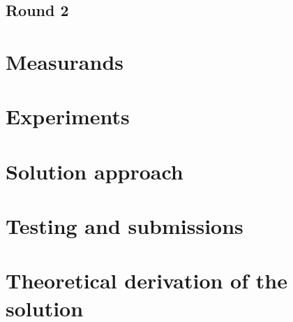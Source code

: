 \subsection{Round 2}




\section{Measurands}

\section{Experiments}
%

\section{Solution approach}


\section{Testing and submissions}

\section{Theoretical derivation of the solution}



